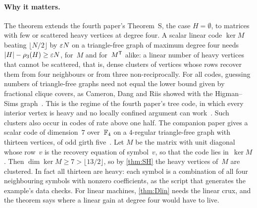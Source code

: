 \paragraph{Why it matters.} The theorem extends the fourth paper's Theorem~S, the case $H=\emptyset$, to matrices with few
or scattered heavy vertices at degree four. A scalar linear code $\ker M$ beating $\lfloor N/2\rfloor$ by $\varepsilon N$ on a
triangle-free graph of maximum degree four needs $\lvert H \rvert-\rho_3(H)\ge\varepsilon N$, for~$M$ and for~$M^{\mathsf{T}}$ alike: a linear number
of heavy vertices that cannot be scattered, that is, dense clusters of vertices whose rows recover them from four neighbours
or from three non-reciprocally. For all codes, guessing numbers of triangle-free graphs need not equal the lower bound
given by fractional clique covers, as Cameron, Dang and Riis showed with the Higman--Sims graph~\cite{CameronDangRiis2016}. This is the regime of the fourth paper's tree code, in which every
interior vertex is heavy and no locally confined argument can work~\cite[Proposition~6.28]{FourthPaper2026}. Such clusters
also occur in codes of rate above one half. The companion paper gives a scalar code of dimension~$7$ over~$\mathbb{F}_4$ on a
$4$-regular triangle-free graph with thirteen vertices, of odd girth five~\cite[Example~7.8]{SeventhPaper2026}. Let $M$ be
the matrix with unit diagonal whose row~$v$ is the recovery equation of symbol~$v$, so that the code lies in~$\ker M$. Then
$\dim\ker M\ge7>\lfloor13/2\rfloor$, so by \cref{thm:SH} the heavy vertices of~$M$ are clustered. In fact all thirteen are
heavy: each symbol is a combination of all four neighbouring symbols with nonzero coefficients, as the script that generates
the example's data checks. For linear machines,
\cref{thm:Dlin} needs the linear crux, and the theorem says where a linear gain at degree four would have to live.

